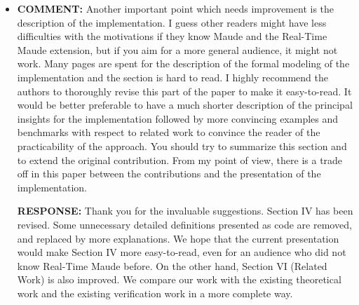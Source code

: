 \documentclass[10pt,journal]{IEEEtran}
\newcommand{\ANSWER}{{\bf RESPONSE: }}
\newcommand{\COMMENT}{{\bf COMMENT: }}
\begin{document}
\begin{itemize}
\item
\COMMENT Another important point which needs improvement is the
description of the implementation. I guess other readers might have
less difficulties with the motivations if they know Maude and the
Real-Time Maude extension, but if you aim for a more general audience,
it might not work. Many pages are spent for the description of the
formal modeling of the implementation and the section is hard to
read. I highly recommend the authors to thoroughly revise this part of
the paper to make it easy-to-read. It would be better preferable to
have a much shorter description of the principal insights for the
implementation followed by more convincing examples and benchmarks
with respect to related work to convince the reader of the
practicability of the approach. You should try to summarize this
section and to extend the original contribution. From my point of
view, there is a trade off in this paper between the contributions and
the presentation of the implementation.

\ANSWER Thank you for the invaluable suggestions. Section IV has been
revised. Some unnecessary detailed definitions presented as code are
removed, and replaced by more explanations. We hope that the current
presentation would make Section IV more easy-to-read, even for an
audience who did not know Real-Time Maude before. On the other hand,
Section VI (Related Work) is also improved. We compare our work with
the existing theoretical work and the existing verification work in a
more complete way.

\end{itemize}
\end{document}
